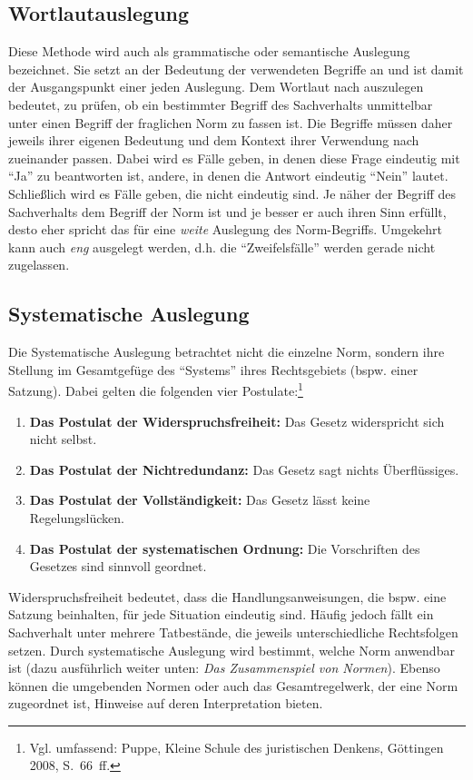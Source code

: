 \subsection{Wortlautauslegung}
Diese Methode wird auch als grammatische oder semantische Auslegung bezeichnet. Sie setzt an der Bedeutung der verwendeten Begriffe an und ist damit der Ausgangspunkt einer jeden Auslegung. Dem Wortlaut nach auszulegen bedeutet, zu prüfen, ob ein bestimmter Begriff des Sachverhalts unmittelbar unter einen Begriff der fraglichen Norm zu fassen ist. Die Begriffe müssen daher jeweils ihrer eigenen Bedeutung und dem Kontext ihrer Verwendung nach zueinander passen. Dabei wird es Fälle geben, in denen diese Frage eindeutig mit \enquote{Ja} zu beantworten ist, andere, in denen die Antwort eindeutig \enquote{Nein} lautet. Schließlich wird es Fälle geben, die nicht eindeutig sind. Je näher der Begriff des Sachverhalts dem Begriff der Norm ist und je besser er auch ihren Sinn erfüllt, desto eher spricht das für eine \emph{weite} Auslegung des Norm-Begriffs. Umgekehrt kann auch \emph{eng} ausgelegt werden, d.h. die \enquote{Zweifelsfälle} werden gerade nicht zugelassen.

\subsection{Systematische Auslegung}
Die Systematische Auslegung betrachtet nicht die einzelne Norm, sondern ihre Stellung im Gesamtgefüge des \enquote{Systems} ihres Rechtsgebiets (bspw. einer Satzung). Dabei gelten die folgenden vier Postulate:\footnote{Vgl. umfassend: Puppe, Kleine Schule des juristischen Denkens, Göttingen 2008, S.~66~ff.}
\begin{enumerate}
\item \textbf{Das Postulat der Widerspruchsfreiheit:} Das Gesetz widerspricht sich nicht selbst.
\item \textbf{Das Postulat der Nichtredundanz:} Das Gesetz sagt nichts Überflüssiges.
\item \textbf{Das Postulat der Vollständigkeit:} Das Gesetz lässt keine Regelungslücken.
\item \textbf{Das Postulat der systematischen Ordnung:} Die Vorschriften des Gesetzes sind sinnvoll geordnet.
\end{enumerate}

Widerspruchsfreiheit bedeutet, dass die Handlungsanweisungen, die bspw. eine Satzung beinhalten, für jede Situation eindeutig sind. Häufig jedoch fällt ein Sachverhalt unter mehrere Tatbestände, die jeweils unterschiedliche Rechtsfolgen setzen. Durch systematische Auslegung wird bestimmt, welche Norm anwendbar ist (dazu ausführlich weiter unten: \emph{Das Zusammenspiel von Normen}). Ebenso können die umgebenden Normen oder auch das Gesamtregelwerk, der eine Norm zugeordnet ist, Hinweise auf deren Interpretation bieten.

